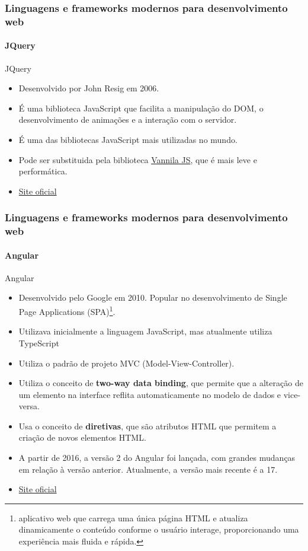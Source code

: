\documentclass[
	9pt, %
	t, %
]{beamer}
\newcommand{\iconLink}[2]{\href{#1}{\faLink \hspace{0.2em} {#2}}}
\begin{document}
\begin{frame}
	\frametitle{Linguagens e frameworks modernos para desenvolvimento web}
	\framesubtitle{JQuery}

	\begin{block}{JQuery}
		\begin{itemize}
			\item Desenvolvido por John Resig em 2006. 
			\item É uma biblioteca JavaScript que facilita a manipulação do DOM, o desenvolvimento de animações e a interação com o servidor.
			\item É uma das bibliotecas JavaScript mais utilizadas no mundo.
			\item Pode ser substituida pela biblioteca \alert{\href{http://vanilla-js.com/}{Vannila JS}}, que é mais leve e performática.
			\item \iconLink{https://jquery.com/}{Site oficial}
		\end{itemize}
	\end{block}

\end{frame}


\begin{frame}
	\frametitle{Linguagens e frameworks modernos para desenvolvimento web}
	\framesubtitle{Angular}

	\begin{block}{Angular}
		\begin{itemize}
			\item Desenvolvido pelo Google em 2010. Popular no desenvolvimento de Single Page Applications (SPA)\footnote{aplicativo web que carrega uma única página HTML e atualiza dinamicamente o conteúdo conforme o usuário interage, proporcionando uma experiência mais fluida e rápida.}.
			\item Utilizava inicialmente a linguagem JavaScript, mas atualmente utiliza TypeScript
			\item Utiliza o padrão de projeto MVC (Model-View-Controller).
			\item Utiliza o conceito de \textbf{two-way data binding}, que permite que a alteração de um elemento na interface reflita automaticamente no modelo de dados e vice-versa.
			\item Usa o conceito de \textbf{diretivas}, que são atributos HTML que permitem a criação de novos elementos HTML.
			\item A partir de 2016, a versão 2 do Angular foi lançada, com grandes mudanças em relação à versão anterior. Atualmente, a versão mais recente é a 17.
			\item \iconLink{https://angular.io/}{Site oficial}
		\end{itemize}
	\end{block}

\end{frame}
\end{document}
